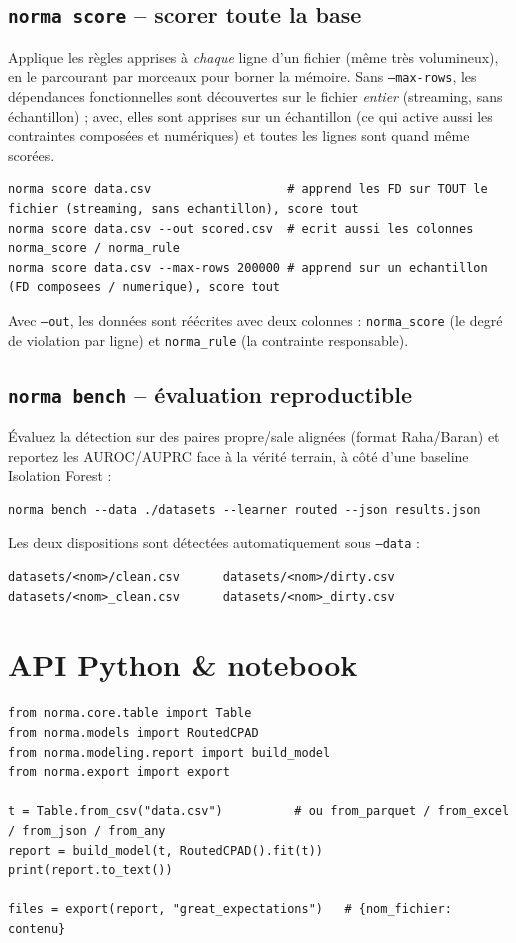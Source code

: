 \documentclass[11pt,a4paper]{article}
\newcommand{\code}[1]{\texttt{#1}}
\begin{document}
\subsection{\code{norma score} -- scorer toute la base}
Applique les règles apprises à \emph{chaque} ligne d'un fichier (même très volumineux), en
le parcourant par morceaux pour borner la mémoire. Sans \code{--max-rows}, les dépendances
fonctionnelles sont découvertes sur le fichier \emph{entier} (streaming, sans échantillon) ;
avec, elles sont apprises sur un échantillon (ce qui active aussi les contraintes composées
et numériques) et toutes les lignes sont quand même scorées.
\begin{lstlisting}
norma score data.csv                   # apprend les FD sur TOUT le fichier (streaming, sans echantillon), score tout
norma score data.csv --out scored.csv  # ecrit aussi les colonnes norma_score / norma_rule
norma score data.csv --max-rows 200000 # apprend sur un echantillon (FD composees / numerique), score tout
\end{lstlisting}
Avec \code{--out}, les données sont réécrites avec deux colonnes : \code{norma\_score} (le
degré de violation par ligne) et \code{norma\_rule} (la contrainte responsable).

\subsection{\code{norma bench} -- évaluation reproductible}
Évaluez la détection sur des paires propre\slash sale alignées (format Raha\slash Baran) et
reportez les AUROC\slash AUPRC face à la vérité terrain, à côté d'une baseline Isolation
Forest :
\begin{lstlisting}
norma bench --data ./datasets --learner routed --json results.json
\end{lstlisting}
Les deux dispositions sont détectées automatiquement sous \code{--data} :
\begin{lstlisting}
datasets/<nom>/clean.csv      datasets/<nom>/dirty.csv
datasets/<nom>_clean.csv      datasets/<nom>_dirty.csv
\end{lstlisting}

\section{API Python \& notebook}
\begin{lstlisting}[style=py]
from norma.core.table import Table
from norma.models import RoutedCPAD
from norma.modeling.report import build_model
from norma.export import export

t = Table.from_csv("data.csv")          # ou from_parquet / from_excel / from_json / from_any
report = build_model(t, RoutedCPAD().fit(t))
print(report.to_text())

files = export(report, "great_expectations")   # {nom_fichier: contenu}
\end{lstlisting}
\end{document}
